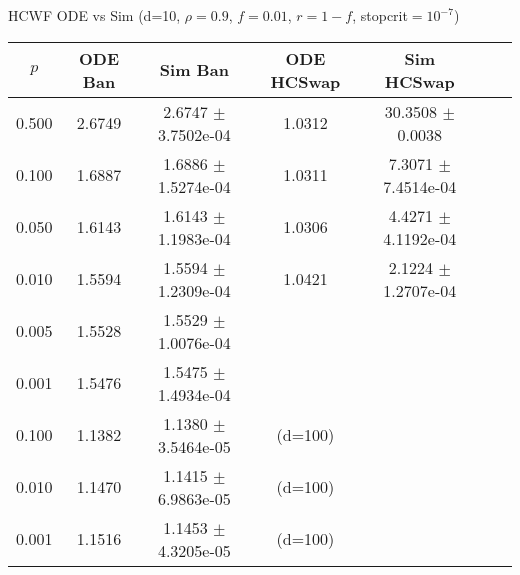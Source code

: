 \documentclass[8pt,a4paper]{beamer}
\begin{document}
\begin{frame}{HCWF ODE vs Sim (d=10, $\rho=0.9$, $f=0.01$, $r=1-f$, stopcrit$=10^{-7}$)}
	\begin{tabular}{c c c c c c c}
		$p$  &  ODE Ban   &  Sim Ban  & ODE HCSwap & Sim HCSwap\\ \hline
		0.500 & 2.6749 & 2.6747 $\pm$ 3.7502e-04 & 1.0312 & 30.3508 $\pm$ 0.0038\\
		0.100 & 1.6887 & 1.6886 $\pm$ 1.5274e-04 & 1.0311 & 7.3071 $\pm$ 7.4514e-04\\
		0.050 & 1.6143 & 1.6143 $\pm$ 1.1983e-04 & 1.0306 & 4.4271 $\pm$ 4.1192e-04\\
		0.010 & 1.5594 & 1.5594 $\pm$ 1.2309e-04 & 1.0421 & 2.1224 $\pm$ 1.2707e-04\\
		0.005 & 1.5528 & 1.5529 $\pm$ 1.0076e-04 &  & \\
		0.001 & 1.5476 & 1.5475 $\pm$ 1.4934e-04 &  & \\
		0.100 & 1.1382 & 1.1380 $\pm$ 3.5464e-05 & (d=100) &\\
		0.010 & 1.1470 & 1.1415 $\pm$ 6.9863e-05 & (d=100)&\\
		0.001 & 1.1516 & 1.1453 $\pm$ 4.3205e-05 & (d=100)&\\
		 \hline
	\end{tabular} 
\end{frame}
\end{document}
